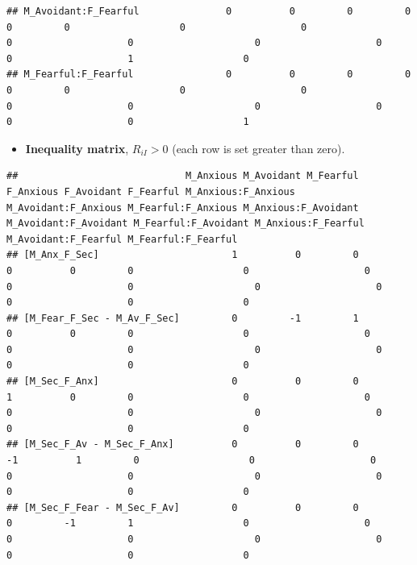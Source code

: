 \documentclass[
]{book}
\providecommand{\tightlist}{%
  \setlength{\itemsep}{0pt}\setlength{\parskip}{0pt}}
\begin{document}
\begin{verbatim}
## M_Avoidant:F_Fearful               0          0         0         0          0         0                   0                    0                   0                    0                     0                    0                   0                    1                   0
## M_Fearful:F_Fearful                0          0         0         0          0         0                   0                    0                   0                    0                     0                    0                   0                    0                   1
\end{verbatim}

\begin{itemize}
\tightlist
\item
  \textbf{Inequality matrix}, \(R_{iI} > 0\) (each row is set greater than zero).
\end{itemize}

\begin{verbatim}
##                             M_Anxious M_Avoidant M_Fearful F_Anxious F_Avoidant F_Fearful M_Anxious:F_Anxious M_Avoidant:F_Anxious M_Fearful:F_Anxious M_Anxious:F_Avoidant M_Avoidant:F_Avoidant M_Fearful:F_Avoidant M_Anxious:F_Fearful M_Avoidant:F_Fearful M_Fearful:F_Fearful
## [M_Anx_F_Sec]                       1          0         0         0          0         0                   0                    0                   0                    0                     0                    0                   0                    0                   0
## [M_Fear_F_Sec - M_Av_F_Sec]         0         -1         1         0          0         0                   0                    0                   0                    0                     0                    0                   0                    0                   0
## [M_Sec_F_Anx]                       0          0         0         1          0         0                   0                    0                   0                    0                     0                    0                   0                    0                   0
## [M_Sec_F_Av - M_Sec_F_Anx]          0          0         0        -1          1         0                   0                    0                   0                    0                     0                    0                   0                    0                   0
## [M_Sec_F_Fear - M_Sec_F_Av]         0          0         0         0         -1         1                   0                    0                   0                    0                     0                    0                   0                    0                   0
\end{verbatim}
\end{document}
